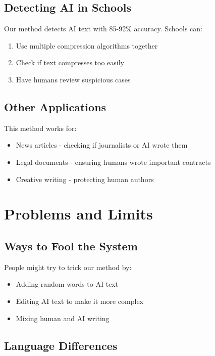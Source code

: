 \documentclass[12pt,a4paper]{report}
\begin{document}
\subsection{Detecting AI in Schools}

Our method detects AI text with 85-92\% accuracy. Schools can:

\begin{enumerate}
    \item Use multiple compression algorithms together
    \item Check if text compresses too easily
    \item Have humans review suspicious cases
\end{enumerate}

\subsection{Other Applications}

This method works for:
\begin{itemize}
    \item News articles - checking if journalists or AI wrote them
    \item Legal documents - ensuring humans wrote important contracts
    \item Creative writing - protecting human authors
\end{itemize}

\section{Problems and Limits}

\subsection{Ways to Fool the System}

People might try to trick our method by:
\begin{itemize}
    \item Adding random words to AI text
    \item Editing AI text to make it more complex
    \item Mixing human and AI writing
\end{itemize}

\subsection{Language Differences}
\end{document}
